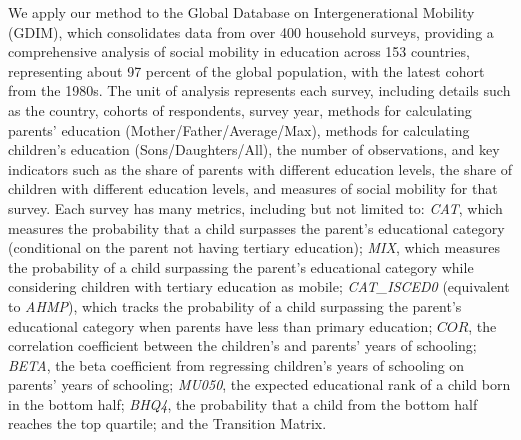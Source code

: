 We apply our method to the Global Database on Intergenerational Mobility (GDIM), which consolidates data from over 400 household surveys, providing a comprehensive analysis of social mobility in education across 153 countries, representing about 97 percent of the global population, with the latest cohort from the 1980s. The unit of analysis represents each survey, including details such as the country, cohorts of respondents, survey year, methods for calculating parents' education (Mother/Father/Average/Max), methods for calculating children's education (Sons/Daughters/All), the number of observations, and key indicators such as the share of parents with different education levels, the share of children with different education levels, and measures of social mobility for that survey. Each survey has many metrics, including but not limited to: \textit{CAT}, which measures the probability that a child surpasses the parent’s educational category (conditional on the parent not having tertiary education); \textit{MIX}, which measures the probability of a child surpassing the parent’s educational category while considering children with tertiary education as mobile; \textit{CAT\_ISCED0} (equivalent to \textit{AHMP}), which tracks the probability of a child surpassing the parent’s educational category when parents have less than primary education; $COR$, the correlation coefficient between the children's and parents' years of schooling; \textit{BETA}, the beta coefficient from regressing children's years of schooling on parents' years of schooling; \textit{MU050}, the expected educational rank of a child born in the bottom half; \textit{BHQ4}, the probability that a child from the bottom half reaches the top quartile; and the Transition Matrix.

